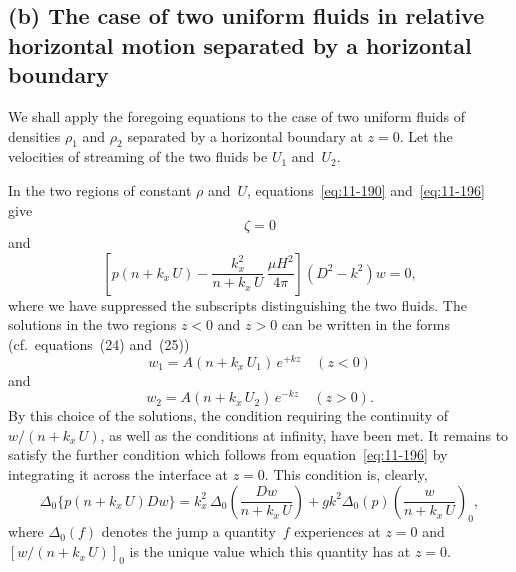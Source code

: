 
\subsection*{(b) The case of two uniform fluids in relative horizontal
  motion separated by a horizontal boundary}

We shall apply the foregoing equations to the case of two uniform
fluids of densities $\rho_1$ and $\rho_2$ separated by a horizontal boundary
at $z=0$.  Let the velocities of streaming of the two fluids be $U_1$
and~$U_2$.

In the two regions of constant $\rho$ and~$U$, equations~\eqref{eq:11-190}
and~\eqref{eq:11-196} give
\begin{equation}
\label{eq:11-197}
\zeta = 0
\end{equation}
and
\begin{equation}
\label{eq:11-198}
\left[p(n+k_x\,U) - \frac{k_x^{2}}{n+k_x\,U}\,
\frac{\mu H^{2}}{4\pi}\right](D^{2}-k^{2})w = 0,
\end{equation}
where we have suppressed the subscripts distinguishing the two fluids.
The solutions in the two regions $z<0$ and $z>0$ can be written in the
forms (cf.\ equations~(24) and~(25))
\begin{equation}
\label{eq:11-199}
w_1 = A(n+k_x\,U_1)\,e^{+kz}\quad (z<0)
\end{equation}
and
\begin{equation}
\label{eq:11-200}
w_2 = A(n+k_x\,U_2)\,e^{-kz}\quad (z>0).
\end{equation}
By this choice of the solutions, the condition requiring the continuity
of $w/(n+k_x\,U)$, as well as the conditions at infinity, have been met.
It remains to satisfy the further condition which follows from
equation~\eqref{eq:11-196} by integrating it across the interface at
$z=0$.  This condition is, clearly,
\begin{equation}
\label{eq:11-201}
\Delta_0\!\bigl\{p(n+k_x\,U)Dw\bigr\}
= k_x^{2}\,\Delta_0\!\!\left(\frac{Dw}{n+k_x\,U}\right)
  + gk^{2}\Delta_0(p)\!\left(\frac{w}{n+k_x\,U}\right)_{\!0},
\end{equation}
where $\Delta_0(f)$ denotes the jump a quantity~$f$ experiences at $z=0$
and $[w/(n+k_x\,U)]_0$ is the unique value which this quantity has at
$z=0$.

